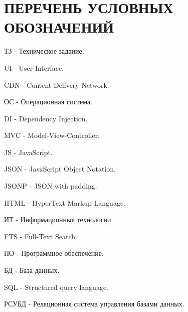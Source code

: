 \section*{ПЕРЕЧЕНЬ УСЛОВНЫХ ОБОЗНАЧЕНИЙ}

ТЗ - Техническое задание.

UI - User Interface.

CDN - Content Delivery Network.

ОС - Операционная система.

DI - Dependency Injection.

MVC - Model-View-Controller.

JS - JavaScript.

JSON - JavaScript Object Notation.

JSONP - JSON with padding.

HTML - HyperText Markup Language.

ИТ - Информационные технологии.

FTS - Full-Text Search.

ПО - Программное обеспечение.

БД - База данных.

SQL - Structured query language.

РСУБД - Реляционная система управления базами данных.

